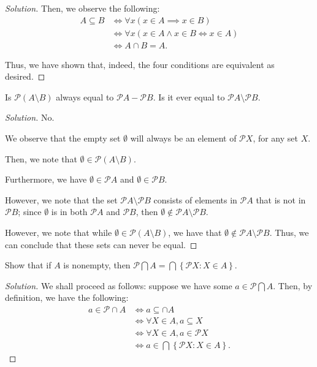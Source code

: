 \documentclass{article}
\newenvironment{solution}{\begin{proof}[Solution]}{\end{proof}}
\renewcommand\qedsymbol{$\blacksquare$}
\newenvironment{innerproof}{\renewcommand{\qedsymbol}{$\square$}\proof}{\endproof}
\newcommand{\brc}[1]{ \left\{  {#1} \right\}}
\begin{document}
\begin{solution}
\begin{innerproof}
		Then, we observe the following:
		\begin{align*}
			A \subseteq B &\iff \forall x (x \in A \implies x \in B) \\
			&\iff \forall x (x \in A \land x \in B \iff x \in A) \\
			&\iff A \cap B = A.
		\end{align*} 
	\end{innerproof}

	Thus, we have shown that, indeed, the four conditions are equivalent as desired.
\end{solution}

\begin{hw}[Problem 2.19]
	Is $\mathscr{P}(A \setminus B)$ always equal to $\mathscr{P} A - \mathscr{P} B$. Is it ever equal to $\mathscr{P} A \setminus \mathscr{P} B$.
\end{hw}
\begin{solution}
	No.
	
	We observe that the empty set $\emptyset$ will always be an element of $\mathscr{P} X$, for any set $X$.
	
	Then, we note that $\emptyset \in \mathscr{P}(A \setminus B)$.
	
	Furthermore, we have $\emptyset \in \mathscr{P}A$ and $\emptyset \in \mathscr{P}B$.
	
	However, we note that the set $\mathscr{P} A \setminus \mathscr{P} B$ consists of elements in $\mathscr{P}A$ that is not in $\mathscr{P}B$; since $\emptyset$ is in both $\mathscr{P}A$ and $\mathscr{P}B$, then $\emptyset \not\in \mathscr{P} A \setminus \mathscr{P} B$.
	
	However, we note that while $\emptyset \in \mathscr{P}(A \setminus B)$, we have that $\emptyset\not\in\mathscr{P} A \setminus \mathscr{P} B$. Thus, we can conclude that these sets can never be equal.
\end{solution}

\begin{hw}[Problem 2.24a]
	Show that if $A$ is nonempty, then $\mathscr{P} \bigcap A= \bigcap \brc{\mathscr{P} X : X \in A}$.
\end{hw}
\begin{solution}
	We shall proceed as follows: suppose we have some $a \in \mathscr{P}\bigcap A$. Then, by definition, we have the following:
	\begin{align*}
		a \in \mathscr{P} \cap A &\iff a \subseteq \cap A \\ 
		&\iff \forall X \in A, a \subseteq X \\
		&\iff \forall X \in A, a \in \mathscr{P} X \\
		&\iff a \in \bigcap \brc{\mathscr{P} X : X \in A}.
	\end{align*}
\end{solution}
\end{document}
